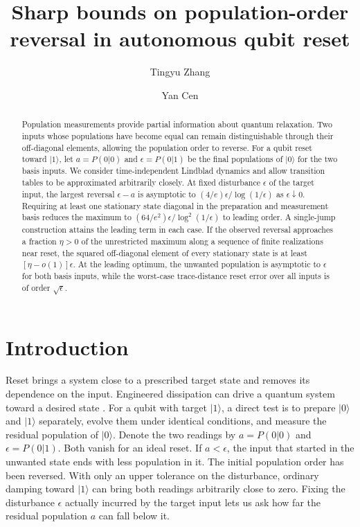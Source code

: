 \documentclass[aps,pra,reprint,amsmath,amssymb,nofootinbib,floatfix,longbibliography]{revtex4-2}
\theoremstyle{aps}
\newcommand{\eps}{\epsilon}
\newcommand{\ket}[1]{|#1\rangle}
\begin{document}
\title{Sharp bounds on population-order reversal in autonomous qubit reset}
\author{Tingyu Zhang}
\author{Yan Cen}


\begin{abstract}

Population measurements provide partial information about quantum relaxation. Two inputs whose populations have become equal can remain distinguishable through their off-diagonal elements, allowing the population order to reverse. For a qubit reset toward $\ket1$, let $a=P(0|0)$ and $\eps=P(0|1)$ be the final populations of $\ket0$ for the two basis inputs. We consider time-independent Lindblad dynamics and allow transition tables to be approximated arbitrarily closely. At fixed disturbance $\eps$ of the target input, the largest reversal $\eps-a$ is asymptotic to $(4/e)\eps/\log(1/\eps)$ as $\eps\downarrow0$. Requiring at least one stationary state diagonal in the preparation and measurement basis reduces the maximum to $(64/e^2)\eps/\log^2(1/\eps)$ to leading order. A single-jump construction attains the leading term in each case. If the observed reversal approaches a fraction $\eta>0$ of the unrestricted maximum along a sequence of finite realizations near reset, the squared off-diagonal element of every stationary state is at least $[\eta-o(1)]\eps$. At the leading optimum, the unwanted population is asymptotic to $\eps$ for both basis inputs, while the worst-case trace-distance reset error over all inputs is of order $\sqrt\eps$.

\end{abstract}
\maketitle

\section{Introduction}\label{sec:setting}

Reset brings a system close to a prescribed target state and removes its dependence on the input. Engineered dissipation can drive a quantum system toward a desired state \cite{Kraus2008,Verstraete2009}. For a qubit with target $\ket1$, a direct test is to prepare $\ket0$ and $\ket1$ separately, evolve them under identical conditions, and measure the residual population of $\ket0$. Denote the two readings by $a=P(0|0)$ and $\eps=P(0|1)$. Both vanish for an ideal reset. If $a<\eps$, the input that started in the unwanted state ends with less population in it. The initial population order has been reversed. With only an upper tolerance on the disturbance, ordinary damping toward $\ket1$ can bring both readings arbitrarily close to zero. Fixing the disturbance $\eps$ actually incurred by the target input lets us ask how far the residual population $a$ can fall below it.
\end{document}
